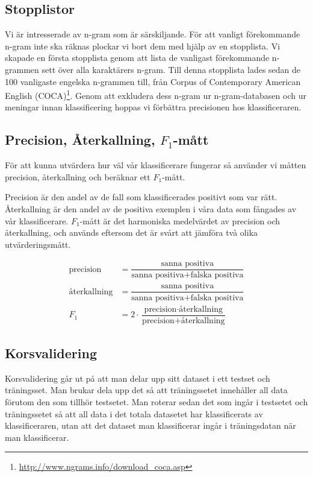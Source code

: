 \documentclass[a4paper]{article}
\begin{document}
\subsection{Stopplistor}
Vi är intresserade av n-gram som är särskiljande. För att vanligt förekommande
n-gram inte ska räknas plockar vi bort dem med hjälp av en stopplista. Vi
skapade en första stopplista genom att lista de vanligast förekommande n-grammen
sett över alla karaktärers n-gram. Till denna stopplista lades sedan de 100
vanligaste engelska n-grammen till, från Corpus of Contemporary American English
(COCA)\footnote{\url{http://www.ngrams.info/download_coca.asp}}. Genom att
exkludera dess n-gram ur n-gram-databasen och ur meningar innan klassificering
hoppas vi förbättra precisionen hos klassificeraren.


\subsection{Precision, Återkallning, $F_1$-mått}
För att kunna utvärdera hur väl vår klassificerare fungerar så använder vi
måtten precision, återkallning och beräknar ett $F_1$-mått.

Precision är den andel av de fall som klassificerades positivt som var rätt.
Återkallning är den andel av de positiva exemplen i våra data som fångades av
vår klassificerare. $F_1$-mått är det harmoniska medelvärdet av precision och
återkallning, och används eftersom det är svårt att jämföra två olika
utvärderingsmått.

\begin{align*}
\text{precision}&=\dfrac{\text{sanna positiva}}{\text{sanna positiva} + \text{falska positiva}}\\
\text{återkallning}&=\dfrac{\text{sanna positiva}}{\text{sanna positiva} + \text{falska positiva}}\\
F_1 &= 2 \cdot \dfrac{\text{precision} \cdot \text{återkallning}}{\text{precision} + \text{återkallning}}
\end{align*}




\subsection{Korsvalidering}
Korsvalidering går ut på att man delar upp sitt dataset i ett testset och
träningsset. Man brukar dela upp det så att träningssetet innehåller all data
förutom den som tillhör testsetet. Man roterar sedan det som ingår i testsetet
och träningssetet så att all data i det totala datasetet har klassificerats av
klassificeraren, utan att det dataset man klassificerar ingår i träningsdatan
när man klassificerar.
\end{document}
